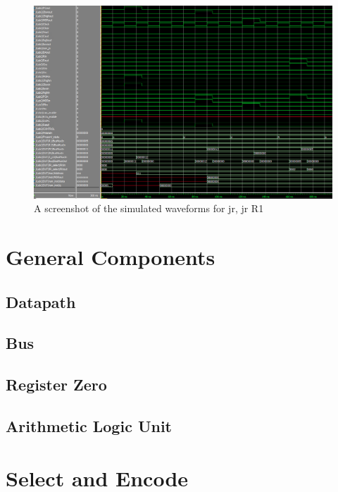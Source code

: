 \documentclass{article}
\begin{document}
        \begin{figure}[h!]
            \begin{center}
                \includegraphics[width=15cm]{jr_wave.png}
                \caption{A screenshot of the simulated waveforms for jr, jr R1}
            \end{center}
        \end{figure}

\cleardoublepage

\appendix
\section{General Components}
    \subsection{Datapath} \label{datapath.v}
        
    \subsection{Bus} \label{Bus.v}
         
    \subsection{Register Zero} \label{register_zero.v}
         
    \subsection{Arithmetic Logic Unit} \label{ALU.v}
        
\section{Select and Encode}
     \label{select_and_encode.v}
\end{document}
